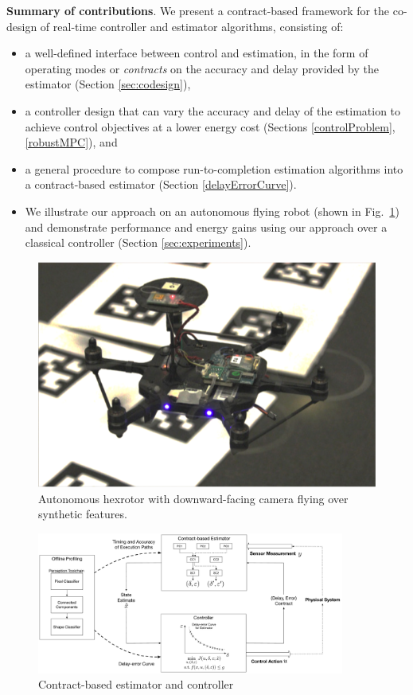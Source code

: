 \textbf{Summary of contributions}.
We present a contract-based framework for the co-design of real-time controller and estimator algorithms, consisting of:
\begin{itemize}
	\item a well-defined interface between control and estimation, in the form of operating modes or \emph{contracts} on the accuracy and delay provided by the estimator (Section \ref{sec:codesign}),
	\item a controller design that can vary the accuracy and delay of the estimation to achieve control objectives at a lower energy cost (Sections \ref{controlProblem}, \ref{robustMPC}), and
	\item a general procedure to compose run-to-completion estimation algorithms into a contract-based estimator (Section \ref{delayErrorCurve}).
	\item We illustrate our approach on an autonomous flying robot (shown in Fig.~\ref{fig:nanohex}) and demonstrate performance and energy gains using our approach over a classical controller (Section \ref{sec:experiments}).
\end{itemize}
\begin{figure}[t]
	\centering
	\includegraphics[width=0.7\linewidth]{figures/nanohex2}
	\caption{Autonomous hexrotor with downward-facing camera flying over synthetic features.}
	\label{fig:nanohex}
	\vspace{-10pt}
\end{figure}


\begin{figure}[t]
	\centering
	\includegraphics[width=0.9\textwidth]{figures/omnigraffle_figures/process_figure2}
	\caption{Contract-based estimator and controller}
	\label{fig:fullcodesignedCE}
	\vspace{-10pt}
\end{figure}